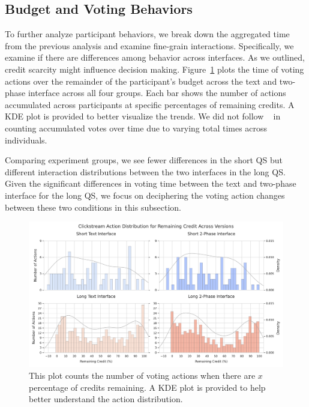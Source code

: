 \subsection{Budget and Voting Behaviors}
To further analyze participant behaviors, we break down the aggregated time from the previous analysis and examine fine-grain interactions. Specifically, we examine if there are differences among behavior across interfaces. As we outlined, credit scarcity might influence decision making.  Figure~\ref{fig:voting_all} plots the time of voting actions over the remainder of the participant's budget across the text and two-phase interface across all four groups. Each bar shows the number of actions accumulated across participants at specific percentages of remaining credits. A KDE plot is provided to better visualize the trends. We did not follow ~\textcite{quarfoot2017quadratic} in counting accumulated votes over time due to varying total times across individuals.

Comparing experiment groups, we see fewer differences in the short QS but different interaction distributions between the two interfaces in the long QS. Given the significant differences in voting time between the text and two-phase interface for the long QS, we focus on deciphering the voting action changes between these two conditions in this subsection.

\begin{figure}[ht]
    \centering
    \includegraphics[width=\textwidth]{content/image/results/clickstream_action_distribution.pdf}
    \caption{This plot counts the number of voting actions when there are $x$ percentage of credits remaining. A KDE plot is provided to help better understand the action distribution.}
    \label{fig:voting_all}
\end{figure}

